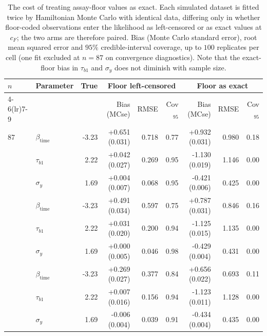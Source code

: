 \begin{table}[!htbp]
\centering
\caption{The cost of treating assay-floor values as exact. Each simulated dataset is fitted twice by Hamiltonian Monte Carlo with identical data, differing only in whether floor-coded observations enter the likelihood as left-censored or as exact values at $c_F$; the two arms are therefore paired. Bias (Monte Carlo standard error), root mean squared error and $95\%$ credible-interval coverage, up to $100$ replicates per cell (one fit excluded at $n=87$ on convergence diagnostics). Note that the exact-floor bias in $\tau_{b1}$ and $\sigma_y$ does not diminish with sample size.}
\label{tab:sim-bias}
\small
\begin{tabular}{llrrrrrrr}
\toprule
$n$ & Parameter & True & \multicolumn{3}{c}{Floor left-censored} & \multicolumn{3}{c}{Floor as exact}\\
\cmidrule(lr){4-6}\cmidrule(lr){7-9}
 & & & Bias (MCse) & RMSE & Cov$_{95}$ & Bias (MCse) & RMSE & Cov$_{95}$\\
\midrule
87 & $\beta_{\mathrm{time}}$ & -3.23 & +0.651 (0.031) & 0.718 & 0.77 & +0.932 (0.031) & 0.980 & 0.18\\
 & $\tau_{b1}$ & 2.22 & +0.042 (0.027) & 0.269 & 0.95 & -1.130 (0.019) & 1.146 & 0.00\\
 & $\sigma_y$ & 1.69 & +0.004 (0.007) & 0.068 & 0.95 & -0.421 (0.006) & 0.425 & 0.00\\
\addlinespace
150 & $\beta_{\mathrm{time}}$ & -3.23 & +0.491 (0.034) & 0.597 & 0.75 & +0.787 (0.031) & 0.846 & 0.16\\
 & $\tau_{b1}$ & 2.22 & +0.031 (0.020) & 0.200 & 0.94 & -1.125 (0.015) & 1.135 & 0.00\\
 & $\sigma_y$ & 1.69 & +0.000 (0.005) & 0.046 & 0.98 & -0.429 (0.004) & 0.431 & 0.00\\
\addlinespace
300 & $\beta_{\mathrm{time}}$ & -3.23 & +0.269 (0.027) & 0.377 & 0.84 & +0.656 (0.022) & 0.693 & 0.11\\
 & $\tau_{b1}$ & 2.22 & +0.007 (0.016) & 0.156 & 0.94 & -1.123 (0.011) & 1.128 & 0.00\\
 & $\sigma_y$ & 1.69 & -0.006 (0.004) & 0.039 & 0.91 & -0.434 (0.004) & 0.435 & 0.00\\
\bottomrule
\end{tabular}
\end{table}
